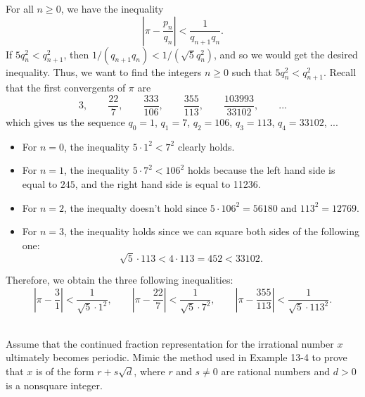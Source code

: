 \begin{solution}
    For all $n \geq 0$, we have the inequality
    $$\left|\pi - \frac{p_n}{q_n}\right|< \frac{1}{q_{n+1}q_n}.$$
    If $5q_n^2 < q_{n+1}^2$, then $1/(q_{n+1}q_n) < 1/(\sqrt{5}q_n^2)$, and so we would get the desired inequality. Thus, we want to find the integers $n \geq 0$ such that $5q_n^2 < q_{n+1}^2$. Recall that the first convergents of $\pi$ are
    $$3, \qquad \frac{22}{7}, \qquad \frac{333}{106}, \qquad \frac{355}{113}, \qquad \frac{103993}{33102}, \qquad ...$$
    which gives us the sequence $q_0 = 1$, $q_1 = 7$, $q_2 = 106$, $q_3 = 113$, $q_4 = 33102$, ...
    \begin{itemize}
        \item For $n = 0$, the inequality $5\cdot 1^2 < 7^2$ clearly holds.
        \item For $n = 1$, the inequality $5\cdot 7^2 < 106^2$ holds because the left hand side is equal to $245$, and the right hand side is equal to 11236.
        \item For $n = 2$, the inequalty doesn't hold since $5\cdot 106^2 = 56180$ and $113^2 = 12769$.
        \item For $n = 3$, the inequality holds since we can square both sides of the following one:
        $$\sqrt{5}\cdot 113 < 4\cdot 113 = 452 < 33102.$$
    \end{itemize}
    Therefore, we obtain the three following inequalities:
    $$\left|\pi - \frac{3}{1}\right| < \frac{1}{\sqrt{5}\cdot 1^2}, \qquad \left|\pi - \frac{22}{7}\right| < \frac{1}{\sqrt{5}\cdot 7^2}, \qquad \left|\pi - \frac{355}{113}\right| < \frac{1}{\sqrt{5}\cdot 113^2}.$$ \\
\end{solution}

\begin{exercise}
    Assume that the continued fraction representation for the irrational number $x$ ultimately becomes periodic. Mimic the method used in Example 13-4 to prove that $x$ is of the form $r + s\sqrt{d}$, where $r$ and $s\neq 0$ are rational numbers and $d > 0$ is a nonsquare integer. \\
\end{exercise}


